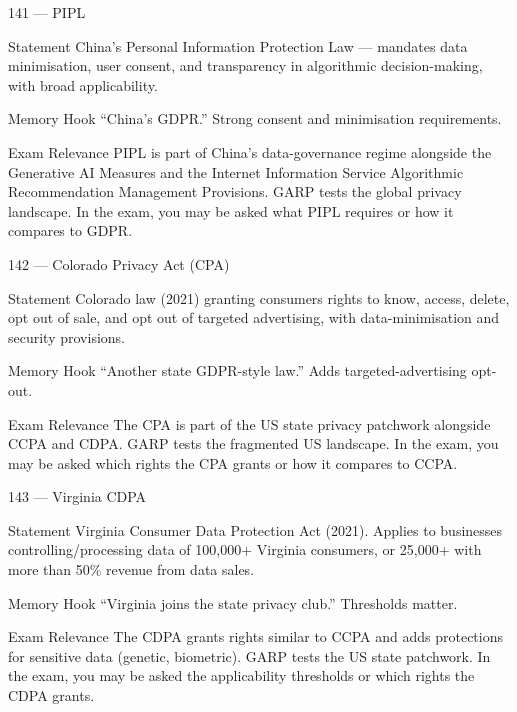 \documentclass[aspectratio=169,8pt]{beamer}
\begin{document}
	\begin{frame}{141 --- PIPL}
		\begin{block}{Statement}
			China's Personal Information Protection Law --- mandates data minimisation, user consent, and transparency in algorithmic decision-making, with broad applicability.
		\end{block}
		\begin{block}{Memory Hook}
			``China's GDPR.'' Strong consent and minimisation requirements.
		\end{block}
		\begin{block}{Exam Relevance}
			PIPL is part of China's data-governance regime alongside the Generative AI Measures and the Internet Information Service Algorithmic Recommendation Management Provisions. GARP tests the global privacy landscape. In the exam, you may be asked what PIPL requires or how it compares to GDPR.
		\end{block}
	\end{frame}
	
	\begin{frame}{142 --- Colorado Privacy Act (CPA)}
		\begin{block}{Statement}
			Colorado law (2021) granting consumers rights to know, access, delete, opt out of sale, and opt out of targeted advertising, with data-minimisation and security provisions.
		\end{block}
		\begin{block}{Memory Hook}
			``Another state GDPR-style law.'' Adds targeted-advertising opt-out.
		\end{block}
		\begin{block}{Exam Relevance}
			The CPA is part of the US state privacy patchwork alongside CCPA and CDPA. GARP tests the fragmented US landscape. In the exam, you may be asked which rights the CPA grants or how it compares to CCPA.
		\end{block}
	\end{frame}
	
	\begin{frame}{143 --- Virginia CDPA}
		\begin{block}{Statement}
			Virginia Consumer Data Protection Act (2021). Applies to businesses controlling/processing data of 100,000+ Virginia consumers, or 25,000+ with more than 50\% revenue from data sales.
		\end{block}
		\begin{block}{Memory Hook}
			``Virginia joins the state privacy club.'' Thresholds matter.
		\end{block}
		\begin{block}{Exam Relevance}
			The CDPA grants rights similar to CCPA and adds protections for sensitive data (genetic, biometric). GARP tests the US state patchwork. In the exam, you may be asked the applicability thresholds or which rights the CDPA grants.
		\end{block}
	\end{frame}
	
\end{document}
